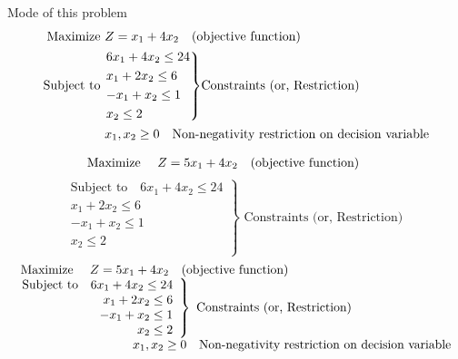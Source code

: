 \documentclass[../main-sheet.tex]{subfiles}
\begin{document}
Mode of this problem
\begin{align*}
    \text{Maximize }   & Z=x_1+4x_2 \quad \text{(objective function)}                               \\
    \text{Subject to } &
    \begin{aligned}
        \begin{rcases}
            6x_1+4x_2 \leq 24 \\
            x_1+2x_2 \leq 6   \\
            -x_1+x_2 \leq 1   \\
            x_2 \leq 2
        \end{rcases}
    \end{aligned}
    \text{Constraints (or, Restriction)}                                                            \\
                       & x_1,x_2\geq 0 \quad \text{Non-negativity restriction on decision variable}
\end{align*}

$$
\begin{array}{r}
  \text{Maximize } \quad Z=5 x_{1}+4 x_{2} \quad\text{(objective function)\qquad}\\
\end{array}$$ $$
\left.\begin{array}{r}
    \text{Subject to} \quad 
    6 x_{1}+4 x_{2} \leq 24 \\
    x_{1}+2 x_{2} \leq 6    \\
    -x_{1}+x_{2} \leq 1     \\
    x_{2} \leq 2            \\
\end{array}\right\} \text { Constraints (or, Restriction) }
$$
\[
    \begin{array}{l}
        \hspace{0.5em}\text{Maximize } \quad Z=5 x_{1}+4 x_{2} \quad\text{(objective function)\qquad}\\
        \left.\begin{array}{r}
            \text{Subject to} \quad
            6 x_{1}+4 x_{2} \leq 24 \\
            x_{1}+2 x_{2} \leq 6    \\
            -x_{1}+x_{2} \leq 1     \\
            x_{2} \leq 2            \\
        \end{array}\right\} \text { Constraints (or, Restriction) }\\
        \begin{array}{r}
            \qquad \qquad \qquad \qquad \quad x_1,x_2\geq 0 \quad \text{Non-negativity restriction on decision variable}\\
        \end{array}
    \end{array}
\]
\end{document}
